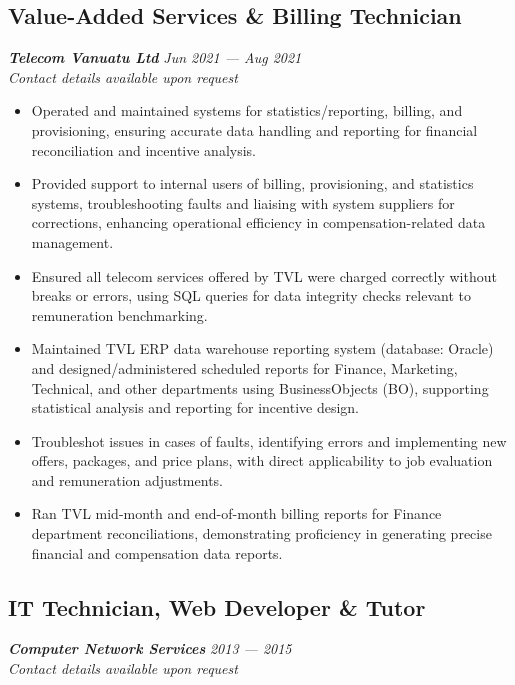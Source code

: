 \documentclass[
  letterpaper,
  DIV=11,
  numbers=noendperiod]{scrartcl}
\providecommand{\tightlist}{%
  \setlength{\itemsep}{0pt}\setlength{\parskip}{0pt}}
\begin{document}
\subsection{Value-Added Services \& Billing
Technician}\label{value-added-services-billing-technician}

\textbf{\emph{Telecom Vanuatu Ltd}} {\emph{Jun 2021 --- Aug 2021}}\\
\emph{Contact details available upon request}

\begin{itemize}
\tightlist
\item
  Operated and maintained systems for statistics/reporting, billing, and
  provisioning, ensuring accurate data handling and reporting for
  financial reconciliation and incentive analysis.
\item
  Provided support to internal users of billing, provisioning, and
  statistics systems, troubleshooting faults and liaising with system
  suppliers for corrections, enhancing operational efficiency in
  compensation-related data management.
\item
  Ensured all telecom services offered by TVL were charged correctly
  without breaks or errors, using SQL queries for data integrity checks
  relevant to remuneration benchmarking.
\item
  Maintained TVL ERP data warehouse reporting system (database: Oracle)
  and designed/administered scheduled reports for Finance, Marketing,
  Technical, and other departments using BusinessObjects (BO),
  supporting statistical analysis and reporting for incentive design.
\item
  Troubleshot issues in cases of faults, identifying errors and
  implementing new offers, packages, and price plans, with direct
  applicability to job evaluation and remuneration adjustments.
\item
  Ran TVL mid-month and end-of-month billing reports for Finance
  department reconciliations, demonstrating proficiency in generating
  precise financial and compensation data reports.
\end{itemize}

\subsection{IT Technician, Web Developer \&
Tutor}\label{it-technician-web-developer-tutor}

\textbf{\emph{Computer Network Services}} {\emph{2013 --- 2015}}\\
\emph{Contact details available upon request}
\end{document}
